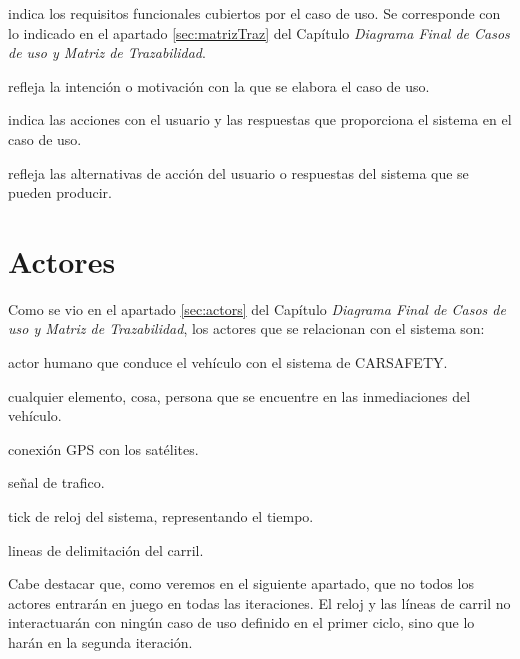 \begin{description}[style=multiline, leftmargin=4cm]
  \item[\textbf{Referencias:}] indica los requisitos funcionales cubiertos por el caso de uso. Se corresponde con lo indicado en el apartado \ref{sec:matrizTraz} del Capítulo \textit{Diagrama Final de Casos de uso y Matriz de Trazabilidad}.
  \item[\textbf{Propósito:}] refleja la intención o motivación con la que se elabora el caso de uso.
  \item[\textbf{Interacción:}] indica las acciones con el usuario y las respuestas que proporciona el sistema en el caso de uso.
  \item[\textbf{Alternativas:}] refleja las alternativas de acción del usuario o respuestas del sistema que se pueden producir.
\end{description}





\section{Actores}
\par Como se vio en el apartado \ref{sec:actors} del Capítulo \textit{Diagrama Final de Casos de uso y Matriz de Trazabilidad}, los actores que se relacionan con el sistema son:
\begin{description}[style=multiline, leftmargin=4cm]
\item[\textbf{Conductor:}] actor humano que conduce el vehículo con el sistema de CARSAFETY.
\item[\textbf{Objeto:}] cualquier elemento, cosa, persona que se encuentre en las inmediaciones del vehículo.
\item[\textbf{GPS:}] conexión GPS con los satélites.
\item[\textbf{Señal:}] señal de trafico.
\item[\textbf{Reloj:}] tick de reloj del sistema, representando el tiempo.
\item[\textbf{Lineas de carril:}] lineas de delimitación del carril.
\end{description}

\par Cabe destacar que, como veremos en el siguiente apartado, que no todos los actores entrarán en juego en todas las iteraciones. El reloj y las líneas de carril no interactuarán con ningún caso de uso definido en el primer ciclo, sino que lo harán en la segunda iteración.




